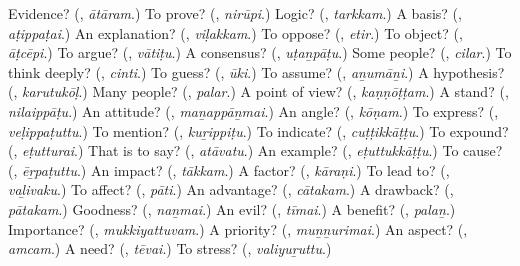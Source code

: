 \begin{tcolorbox}[breakable,colback=teal!4,colframe=teal!35!black,title={Before you move on}]
Evidence? (\textbf{}, \emph{ātāram}.) To prove? (\textbf{}, \emph{nirūpi}.) Logic? (\textbf{}, \emph{tarkkam}.) A basis? (\textbf{}, \emph{aṭippaṭai}.) An explanation? (\textbf{}, \emph{viḷakkam}.) To oppose? (\textbf{}, \emph{etir}.) To object? (\textbf{}, \emph{āṭcēpi}.) To argue? (\textbf{}, \emph{vātiṭu}.) A consensus? (\textbf{}, \emph{uṭaṉpāṭu}.) Some people? (\textbf{}, \emph{cilar}.) To think deeply? (\textbf{}, \emph{cinti}.) To guess? (\textbf{}, \emph{ūki}.) To assume? (\textbf{}, \emph{aṉumāṉi}.) A hypothesis? (\textbf{}, \emph{karutukōḷ}.) Many people? (\textbf{}, \emph{palar}.) A point of view? (\textbf{}, \emph{kaṇṇōṭṭam}.) A stand? (\textbf{}, \emph{nilaippāṭu}.) An attitude? (\textbf{}, \emph{maṉappāṉmai}.) An angle? (\textbf{}, \emph{kōṇam}.) To express? (\textbf{}, \emph{veḷippaṭuttu}.) To mention? (\textbf{}, \emph{kuṟippiṭu}.) To indicate? (\textbf{}, \emph{cuṭṭikkāṭṭu}.) To expound? (\textbf{}, \emph{eṭutturai}.) That is to say? (\textbf{}, \emph{atāvatu}.) An example? (\textbf{}, \emph{eṭuttukkāṭṭu}.) To cause? (\textbf{}, \emph{ēṟpaṭuttu}.) An impact? (\textbf{}, \emph{tākkam}.) A factor? (\textbf{}, \emph{kāraṇi}.) To lead to? (\textbf{}, \emph{vaḻivaku}.) To affect? (\textbf{}, \emph{pāti}.) An advantage? (\textbf{}, \emph{cātakam}.) A drawback? (\textbf{}, \emph{pātakam}.) Goodness? (\textbf{}, \emph{naṉmai}.) An evil? (\textbf{}, \emph{tīmai}.) A benefit? (\textbf{}, \emph{palaṉ}.) Importance? (\textbf{}, \emph{mukkiyattuvam}.) A priority? (\textbf{}, \emph{muṉṉurimai}.) An aspect? (\textbf{}, \emph{amcam}.) A need? (\textbf{}, \emph{tēvai}.) To stress? (\textbf{}, \emph{valiyuṟuttu}.)
\end{tcolorbox}
